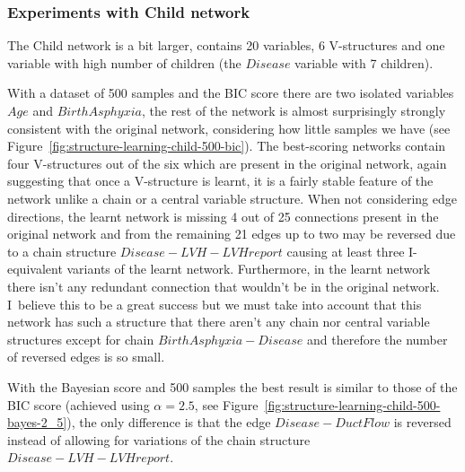 \documentclass[english,cover]{fitthesis} %
\begin{document}
\subsubsection{Experiments with Child network}
The Child network is a bit larger, contains 20 variables, 6 V-structures and one variable with high number of children (the $Disease$ variable with 7 children).

With a dataset of 500 samples and the BIC score there are two isolated variables $Age$ and $BirthAsphyxia$, the rest of the network is almost surprisingly strongly consistent with the original network, considering how little samples we have (see Figure~\ref{fig:structure-learning-child-500-bic}). The best-scoring networks contain four V-structures out of the six which are present in the original network, again suggesting that once a V-structure is learnt, it is a fairly stable feature of the network unlike a chain or a central variable structure. When not considering edge directions, the learnt network is missing 4 out of 25 connections present in the original network and from the remaining 21 edges up to two may be reversed due to a chain structure $Disease - LVH - LVHreport$ causing at least three I-equivalent variants of the learnt network. Furthermore, in the learnt network there isn't any redundant connection that wouldn't be in the original network. I~believe this to be a great success but we must take into account that this network has such a structure that there aren't any chain nor central variable structures except for chain $BirthAsphyxia - Disease$ and therefore the number of reversed edges is so small.

With the Bayesian score and 500 samples the best result is similar to those of the BIC score (achieved using $\alpha=2.5$, see Figure~\ref{fig:structure-learning-child-500-bayes-2_5}), the only difference is that the edge $Disease - DuctFlow$ is reversed instead of allowing for variations of the chain structure $Disease - LVH - LVHreport$.
\end{document}
